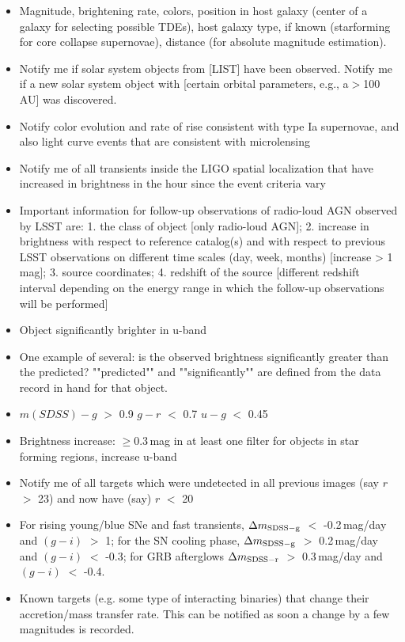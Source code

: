 \documentclass{article}
\begin{document}
\begin{itemize}
\item Magnitude, brightening rate, colors, position in host galaxy (center of a galaxy for selecting possible TDEs), host galaxy type, if known (starforming for core collapse supernovae), distance (for absolute magnitude estimation).
\item Notify me if solar system objects from [LIST] have been observed. Notify me if a new solar system object with [certain orbital parameters, e.g., a$>$100 AU] was discovered. 
\item Notify color evolution and rate of rise consistent with type Ia supernovae, and also light curve events that are consistent with microlensing
\item Notify me of all transients inside the LIGO spatial localization that have increased in brightness in the hour since the event criteria vary
\item Important information for follow-up observations of radio-loud AGN observed by LSST are: 1. the class of object [only radio-loud AGN]; 2. increase in brightness with respect to reference catalog(s) and with respect to previous LSST observations on different time scales (day, week, months) [increase > 1 mag]; 3. source coordinates; 4. redshift of the source [different redshift interval depending on the energy range in which the follow-up observations will be performed]
\item Object significantly brighter in u-band  
\item One example of several: is the observed brightness significantly greater than the predicted? ""predicted"" and ""significantly"" are defined from the data record in hand for that object.
\item $m(SDSS) - g$ $>$ 0.9 $g-r$ $<$ 0.7 $u-g$ $<$ 0.45
\item Brightness increase: $\geq$0.3\,mag in at least one filter for objects in star forming regions, increase u-band
\item Notify me of all targets which were undetected in all previous images (say $r$ $>$ 23) and now have (say) $r$ $<$ 20
\item For rising young/blue SNe and fast transients, $\Delta m_{\rm{SDSS-g}}$ $<$ -0.2\,mag/day and $(g-i)$ $>$ 1; for the SN cooling phase, $\Delta m_{\rm{SDSS-g}}$ $>$ 0.2\,mag/day and $(g-i)$ $<$ -0.3; for GRB afterglows $\Delta m_{\rm{SDSS-r}}$ $>$ 0.3\,mag/day and $(g-i)$ $<$ -0.4.
\item Known targets (e.g. some type of interacting binaries) that change their accretion/mass transfer rate. This can be notified as soon a change by a few magnitudes is recorded. 

\end{itemize}
\end{document}
